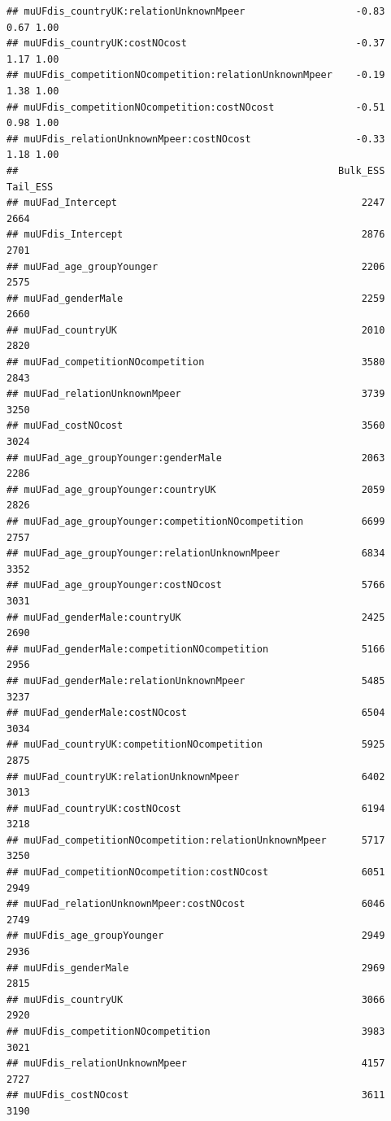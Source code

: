 \documentclass[
]{article}
\begin{document}
\begin{verbatim}
## muUFdis_countryUK:relationUnknownMpeer                   -0.83     0.67 1.00
## muUFdis_countryUK:costNOcost                             -0.37     1.17 1.00
## muUFdis_competitionNOcompetition:relationUnknownMpeer    -0.19     1.38 1.00
## muUFdis_competitionNOcompetition:costNOcost              -0.51     0.98 1.00
## muUFdis_relationUnknownMpeer:costNOcost                  -0.33     1.18 1.00
##                                                       Bulk_ESS Tail_ESS
## muUFad_Intercept                                          2247     2664
## muUFdis_Intercept                                         2876     2701
## muUFad_age_groupYounger                                   2206     2575
## muUFad_genderMale                                         2259     2660
## muUFad_countryUK                                          2010     2820
## muUFad_competitionNOcompetition                           3580     2843
## muUFad_relationUnknownMpeer                               3739     3250
## muUFad_costNOcost                                         3560     3024
## muUFad_age_groupYounger:genderMale                        2063     2286
## muUFad_age_groupYounger:countryUK                         2059     2826
## muUFad_age_groupYounger:competitionNOcompetition          6699     2757
## muUFad_age_groupYounger:relationUnknownMpeer              6834     3352
## muUFad_age_groupYounger:costNOcost                        5766     3031
## muUFad_genderMale:countryUK                               2425     2690
## muUFad_genderMale:competitionNOcompetition                5166     2956
## muUFad_genderMale:relationUnknownMpeer                    5485     3237
## muUFad_genderMale:costNOcost                              6504     3034
## muUFad_countryUK:competitionNOcompetition                 5925     2875
## muUFad_countryUK:relationUnknownMpeer                     6402     3013
## muUFad_countryUK:costNOcost                               6194     3218
## muUFad_competitionNOcompetition:relationUnknownMpeer      5717     3250
## muUFad_competitionNOcompetition:costNOcost                6051     2949
## muUFad_relationUnknownMpeer:costNOcost                    6046     2749
## muUFdis_age_groupYounger                                  2949     2936
## muUFdis_genderMale                                        2969     2815
## muUFdis_countryUK                                         3066     2920
## muUFdis_competitionNOcompetition                          3983     3021
## muUFdis_relationUnknownMpeer                              4157     2727
## muUFdis_costNOcost                                        3611     3190

\end{verbatim}
\end{document}

